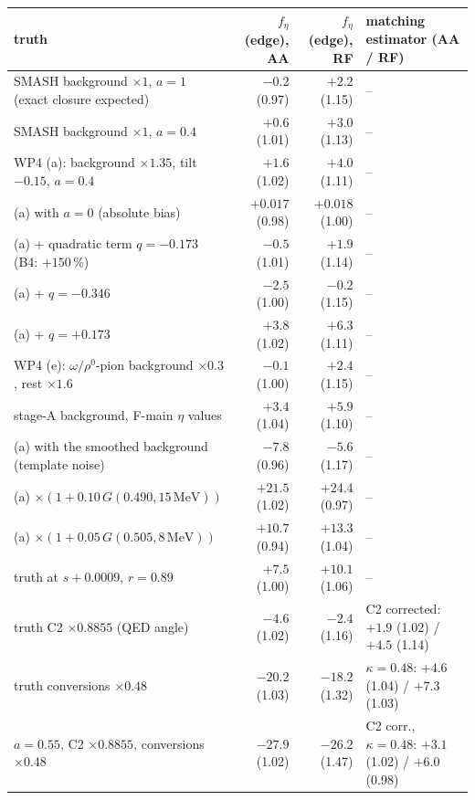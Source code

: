 \begin{tabular}{lrrl}
\hline
 truth & $f_\eta$(edge), AA & $f_\eta$(edge), RF & matching estimator (AA / RF) \\
\hline
 SMASH background $\times1$, $a=1$ (exact closure expected) & $-0.2$ (0.97) & $+2.2$ (1.15) & -- \\
 SMASH background $\times1$, $a=0.4$ & $+0.6$ (1.01) & $+3.0$ (1.13) & -- \\
 WP4 (a): background $\times1.35$, tilt $-0.15$, $a=0.4$ & $+1.6$ (1.02) & $+4.0$ (1.11) & -- \\
 (a) with $a=0$ (absolute bias) & $+0.017$ (0.98) & $+0.018$ (1.00) & -- \\
 (a) + quadratic term $q=-0.173$ (B4: $+150$\,\%) & $-0.5$ (1.01) & $+1.9$ (1.14) & -- \\
 (a) + $q=-0.346$ & $-2.5$ (1.00) & $-0.2$ (1.15) & -- \\
 (a) + $q=+0.173$ & $+3.8$ (1.02) & $+6.3$ (1.11) & -- \\
 WP4 (e): $\omega/\rho^0$-pion background $\times0.3$, rest $\times1.6$ & $-0.1$ (1.00) & $+2.4$ (1.15) & -- \\
 stage-A background, F-main $\eta$ values & $+3.4$ (1.04) & $+5.9$ (1.10) & -- \\
 (a) with the smoothed background (template noise) & $-7.8$ (0.96) & $-5.6$ (1.17) & -- \\
 (a) $\times(1+0.10\,G(0.490, 15\,\mathrm{MeV}))$ & $+21.5$ (1.02) & $+24.4$ (0.97) & -- \\
 (a) $\times(1+0.05\,G(0.505, 8\,\mathrm{MeV}))$ & $+10.7$ (0.94) & $+13.3$ (1.04) & -- \\
 truth at $s+0.0009$, $r=0.89$ & $+7.5$ (1.00) & $+10.1$ (1.06) & -- \\
 truth C2 $\times0.8855$ (QED angle) & $-4.6$ (1.02) & $-2.4$ (1.16) & C2 corrected: $+1.9$ (1.02) / $+4.5$ (1.14) \\
 truth conversions $\times0.48$ & $-20.2$ (1.03) & $-18.2$ (1.32) & $\kappa=0.48$: $+4.6$ (1.04) / $+7.3$ (1.03) \\
 $a=0.55$, C2 $\times0.8855$, conversions $\times0.48$ & $-27.9$ (1.02) & $-26.2$ (1.47) & C2 corr., $\kappa=0.48$: $+3.1$ (1.02) / $+6.0$ (0.98) \\
\hline
\end{tabular}

